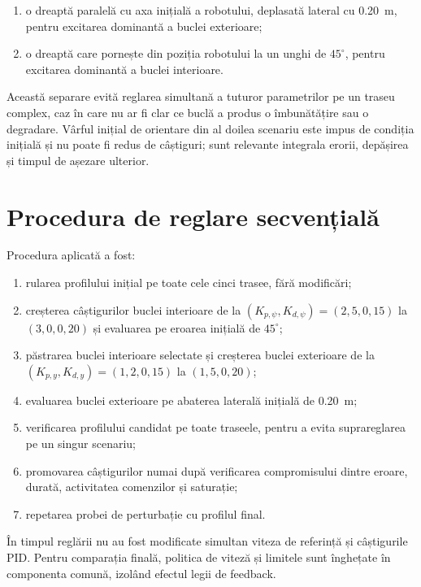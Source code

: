\documentclass[12pt,a4paper,oneside]{report}
\begin{document}
\begin{enumerate}
  \item o dreaptă paralelă cu axa inițială a robotului, deplasată lateral cu
        \SI{0.20}{m}, pentru excitarea dominantă a buclei exterioare;
  \item o dreaptă care pornește din poziția robotului la un unghi de
        $45^\circ$, pentru excitarea dominantă a buclei interioare.
\end{enumerate}

Această separare evită reglarea simultană a tuturor parametrilor pe un traseu
complex, caz în care nu ar fi clar ce buclă a produs o îmbunătățire sau o
degradare. Vârful inițial de orientare din al doilea scenariu este impus de
condiția inițială și nu poate fi redus de câștiguri; sunt relevante integrala
erorii, depășirea și timpul de așezare ulterior.

\section{Procedura de reglare secvențială}

Procedura aplicată a fost:

\begin{enumerate}
  \item rularea profilului inițial pe toate cele cinci trasee, fără modificări;
  \item creșterea câștigurilor buclei interioare de la
        $(K_{p,\psi},K_{d,\psi})=(2{,}5,0{,}15)$ la $(3{,}0,0{,}20)$ și
        evaluarea pe eroarea inițială de $45^\circ$;
  \item păstrarea buclei interioare selectate și creșterea buclei exterioare de
        la $(K_{p,y},K_{d,y})=(1{,}2,0{,}15)$ la $(1{,}5,0{,}20)$;
  \item evaluarea buclei exterioare pe abaterea laterală inițială de
        \SI{0.20}{m};
  \item verificarea profilului candidat pe toate traseele, pentru a evita
        suprareglarea pe un singur scenariu;
  \item promovarea câștigurilor numai după verificarea compromisului dintre
        eroare, durată, activitatea comenzilor și saturație;
  \item repetarea probei de perturbație cu profilul final.
\end{enumerate}

În timpul reglării nu au fost modificate simultan viteza de referință și
câștigurile PID. Pentru comparația finală, politica de viteză și limitele sunt
înghețate în componenta comună, izolând efectul legii de feedback.
\end{document}
